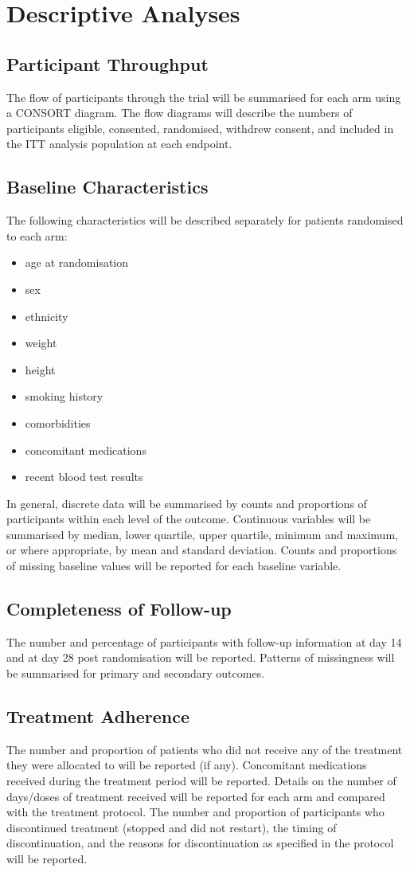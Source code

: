 \documentclass[11pt,parskip=half-]{scrartcl}
\begin{document}
\section{Descriptive Analyses}

\subsection{Participant Throughput}
The flow of participants through the trial will be summarised for each arm using a CONSORT diagram. The flow diagrams will describe the numbers of participants eligible, consented, randomised, withdrew consent, and included in the ITT analysis population at each endpoint.

\subsection{Baseline Characteristics}
The following characteristics will be described separately for patients randomised to each arm:
\begin{itemize}
    \item age at randomisation
    \item sex
    \item ethnicity
    \item weight
    \item height
    \item smoking history
    \item comorbidities
    \item concomitant medications
    \item recent blood test results
\end{itemize}
In general, discrete data will be summarised by counts and proportions of participants within each level of the outcome. Continuous variables will be summarised by median, lower quartile, upper quartile, minimum and maximum, or where appropriate, by mean and standard deviation. Counts and proportions of missing baseline values will be reported for each baseline variable.

\subsection{Completeness of Follow-up}
The number and percentage of participants with follow-up information at day 14 and at day 28 post randomisation will be reported. Patterns of missingness will be summarised for primary and secondary outcomes.

\subsection{Treatment Adherence}
The number and proportion of patients who did not receive any of the treatment they were allocated to will be reported (if any). Concomitant medications received during the treatment period will be reported. Details on the number of days/doses of treatment received will be reported for each arm and compared with the treatment protocol. The number and proportion of participants who discontinued treatment (stopped and did not restart), the timing of discontinuation, and the reasons for discontinuation as specified in the protocol will be reported.
\end{document}
